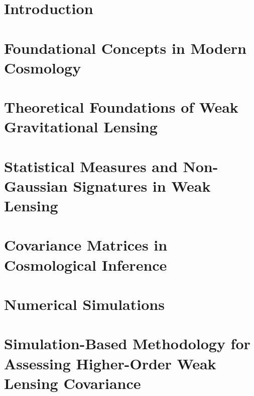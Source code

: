 \documentclass[11pt,a4paper]{ipmu}
\begin{document}
\makethesistitle
\frontmatter
%     


\tableofcontents  %
\listoffigures    %
\listoftables     %


\chapter{Introduction}
\label{chap:introduction}
\mainmatter
\minitoc 


\chapter{Foundational Concepts in Modern Cosmology}
\label{chap:cosmology}
\minitoc 


\chapter{Theoretical Foundations of Weak Gravitational Lensing}
\label{chap:weak_lensing}
\minitoc 


\chapter{Statistical Measures and Non-Gaussian Signatures in Weak Lensing}
\label{chap:statistics}
\minitoc 


\chapter{Covariance Matrices in Cosmological Inference}
\label{chap:covariance}
\minitoc 


\chapter{Numerical Simulations}
\label{chap:simulation}
\minitoc 


\chapter{Simulation-Based Methodology for Assessing Higher-Order Weak Lensing Covariance}
\label{chap:methods}
\minitoc 

\end{document}
